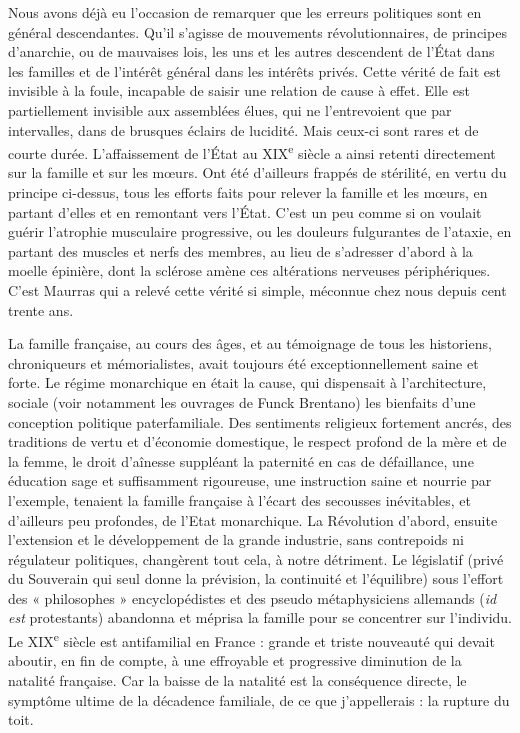 \documentclass[french,twoside]{book} %
\newcommand\chaptercont{} %
\renewcommand\chaptercont{} %
\begin{document}
\chaptercont
\noindent Nous avons déjà eu l’occasion de remarquer que les erreurs politiques sont en général descendantes. Qu’il s’agisse de mouvements révolutionnaires, de principes d’anarchie, ou de mauvaises lois, les uns et les autres descendent de l’État dans les familles et de l’intérêt général dans les intérêts privés. Cette vérité de fait est invisible à la foule, incapable de saisir une relation de cause à effet. Elle est partiellement invisible aux assemblées élues, qui ne l’entrevoient que par intervalles, dans de brusques éclairs de lucidité. Mais ceux-ci sont rares et de courte durée. L’affaissement de l’État au XIX\textsuperscript{e} siècle a ainsi retenti directement sur la famille et sur les mœurs. Ont été d’ailleurs frappés de stérilité, en vertu du principe ci-dessus, tous les efforts faits pour relever la famille et les mœurs, en partant d’elles et en remontant vers l’État. C’est un peu comme si on voulait guérir l’atrophie musculaire progressive, ou les douleurs fulgurantes de l’ataxie, en partant des muscles et nerfs des membres, au lieu de s’adresser d’abord à la moelle épinière, dont la sclérose amène ces altérations nerveuses périphériques. C’est Maurras qui a relevé cette vérité si simple, méconnue chez nous depuis cent trente ans.\par
La famille française, au cours des âges, et au témoignage de tous les historiens, chroniqueurs et mémorialistes, avait toujours été exceptionnellement saine et forte. Le régime monarchique en était la cause, qui dispensait à l’architecture, sociale (voir notamment les ouvrages de Funck Brentano) les bienfaits d’une conception politique paterfamiliale. Des sentiments religieux fortement ancrés, des traditions de vertu et d’économie domestique, le respect profond de la mère et de la femme, le droit d’aînesse suppléant la paternité en cas de défaillance, une éducation sage et suffisamment rigoureuse, une instruction saine et nourrie par l’exemple, tenaient la famille française à l’écart des secousses inévitables, et d’ailleurs peu profondes, de l’Etat monarchique. La Révolution d’abord, ensuite l’extension et le développement de la grande industrie, sans contrepoids ni régulateur politiques, changèrent tout cela, à notre détriment. Le législatif (privé du Souverain qui seul donne la prévision, la continuité et l’équilibre) sous l’effort des « philosophes » encyclopédistes et des pseudo métaphysiciens allemands ({\itshape id est} protestants) abandonna et méprisa la famille pour se concentrer sur l’individu. Le XIX\textsuperscript{e} siècle est antifamilial en France : grande et triste nouveauté qui devait aboutir, en fin de compte, à une effroyable et progressive diminution de la natalité française. Car la baisse de la natalité est la conséquence directe, le symptôme ultime de la décadence familiale, de ce que j’appellerais : la rupture du toit.\par
\end{document}
